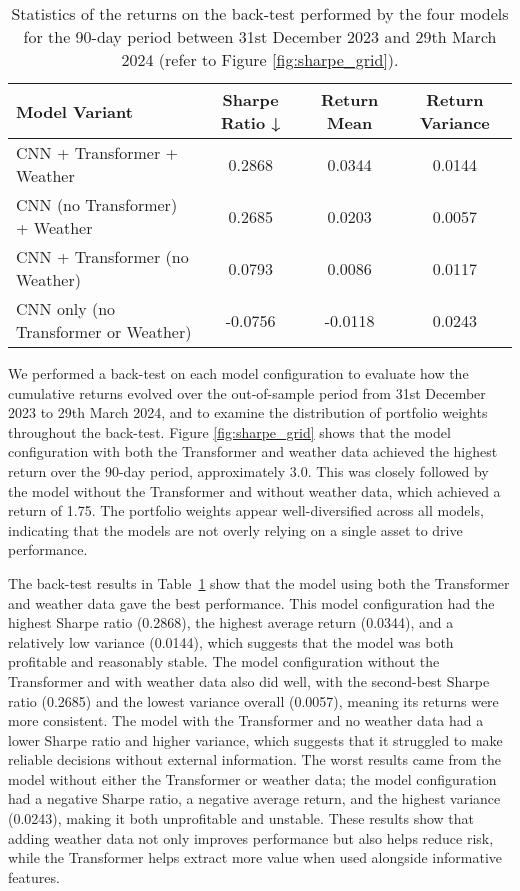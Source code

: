 \documentclass[12pt]{article}
\begin{document}
\begin{table}[H]
\centering
\begin{tabular}{|l|c|c|c|}
\hline
\textbf{Model Variant} & \textbf{Sharpe Ratio ↓} & \textbf{Return Mean} & \textbf{Return Variance} \\
\hline
CNN + Transformer + Weather          & 0.2868 & 0.0344 & 0.0144 \\
CNN (no Transformer) + Weather       & 0.2685 & 0.0203 & 0.0057 \\
CNN + Transformer (no Weather)       & 0.0793 & 0.0086 & 0.0117 \\
CNN only (no Transformer or Weather) & -0.0756 & -0.0118 & 0.0243 \\
\hline
\end{tabular}
\caption{Statistics of the returns on the back-test performed by the four models for the 90-day period between 31st December 2023 and 29th March 2024 (refer to Figure \ref{fig:sharpe_grid}).}
\label{tab:sharpe_comparison}
\end{table}

\noindent
We performed a back-test on each model configuration to evaluate how the cumulative returns evolved over the out-of-sample period from 31st December 2023 to 29th March 2024, and to examine the distribution of portfolio weights throughout the back-test. Figure \ref{fig:sharpe_grid} shows that the model configuration with both the Transformer and weather data achieved the highest return over the 90-day period, approximately 3.0. This was closely followed by the model without the Transformer and without weather data, which achieved a return of 1.75. The portfolio weights appear well-diversified across all models, indicating that the models are not overly relying on a single asset to drive performance.

\noindent
The back-test results in Table~\ref{tab:sharpe_comparison} show that the model using both the Transformer and weather data gave the best performance. This model configuration had the highest Sharpe ratio (0.2868), the highest average return (0.0344), and a relatively low variance (0.0144), which suggests that the model was both profitable and reasonably stable. The model configuration without the Transformer and with weather data also did well, with the second-best Sharpe ratio (0.2685) and the lowest variance overall (0.0057), meaning its returns were more consistent. The model with the Transformer and no weather data had a lower Sharpe ratio and higher variance, which suggests that it struggled to make reliable decisions without external information. The worst results came from the model without either the Transformer or weather data; the model configuration had a negative Sharpe ratio, a negative average return, and the highest variance (0.0243), making it both unprofitable and unstable. These results show that adding weather data not only improves performance but also helps reduce risk, while the Transformer helps extract more value when used alongside informative features.
\end{document}
